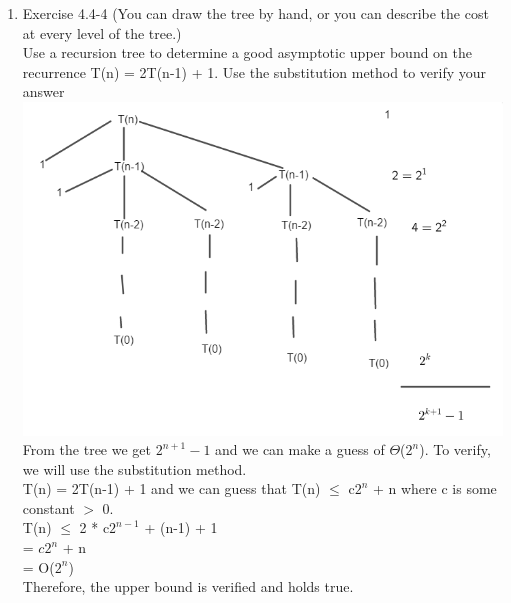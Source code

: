 \documentclass[12pt]{article}
\begin{document}
\begin{enumerate}
\item Exercise 4.4-4 (You can draw the tree by hand, or you can describe the cost at every level of the tree.)\\
Use a recursion tree to determine a good asymptotic upper bound on the recurrence
T(n) = 2T(n-1) + 1. Use the substitution method to verify your answer\\
\includegraphics[scale=1]{Recursivetree.png} \\
From the tree we get $2^{n+1} -1$ and we can make a guess of $\Theta$($2^n$). To verify, we will use the substitution method.\\
T(n) = 2T(n-1) + 1 and we can guess that T(n) $\leq$ c$2^n$ + n where c is some constant $>$ 0.\\
T(n) $\leq$ 2 * c$2^{n-1}$ + (n-1) + 1 \\
= $c2^n$ + n \\
= O($2^n$) \\
Therefore, the upper bound is verified and holds true.\\ 


\end{enumerate}
\end{document}
